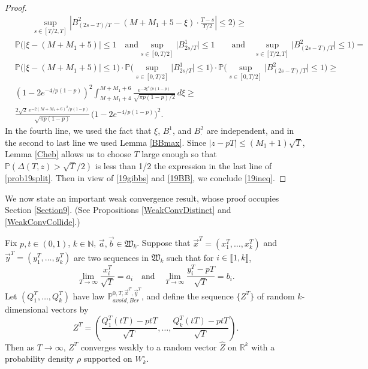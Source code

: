 \begin{proof}
\begin{equation}
\begin{split}
	&\qquad  \sup_{s\in[T/2,T]}\left|B^2_{(2s-T)/T}-(M+M_1+5-\xi)\cdot\frac{T-s}{T/2}\right| \leq 2 \bigg) \geq \\
	& \mathbb{P}\bigg(|\xi - (M+M_1+5)|\leq 1 \quad\mathrm{and} \sup_{s\in[0,T/2]}\big|B^1_{2s/T}\big| \leq 1 \qquad \mathrm{and}\quad \sup_{s\in[T/2,T]}\big|B^2_{(2s-T)/T}\big| \leq 1 \bigg) =\\
	& \mathbb{P}\Big(|\xi-(M+M_1+5)|\leq 1\Big)\cdot \mathbb{P}\bigg(\sup_{s\in[0,T/2]} \big|B^1_{2s/T}\big|\leq 1\bigg)\cdot \mathbb{P}\bigg(\sup_{s\in[0,T/2]} \big|B^2_{(2s-T)/T}\big|\leq 1\bigg) \geq\\
	& \left(1-2e^{-4/p(1-p)}\right)^2 \int_{M+M_1+4}^{M+M_1+6} \frac{e^{-2\xi^2/p(1-p)}}{\sqrt{\pi p(1-p)/2}}\,d\xi \geq\\
	& \frac{2\sqrt{2}\,e^{-2(M+M_1+6)^2/p(1-p)}}{\sqrt{\pi p(1-p)}}\,\big(1-2e^{-4/p(1-p)}\big)^2.
	\end{split}
	\end{equation}
	In the fourth line, we used the fact that $\xi$, $B^1_\cdot$, and $B^2_\cdot$ are independent, and in the second to last line we used Lemma \ref{BBmax}. Since $|z-pT|\leq (M_1+1)\sqrt{T}$, Lemma \ref{Cheb} allows us to choose $T$ large enough so that $\mathbb{P}(\Delta(T,z) > \sqrt{T}/2)$ is less than 1/2 the expression in the last line of \eqref{prob19split}. Then in view of \eqref{19gibbs} and \eqref{19BB}, we conclude \eqref{19ineq}.
	
\end{proof}

We now state an important weak convergence result, whose proof occupies Section \ref{Section9}. (See Propositions \ref{WeakConvDistinct} and \ref{WeakConvCollide}.)

\begin{proposition}\label{prob17}
Fix $p,t\in(0,1)$, $k\in\mathbb{N}$, $\vec a, \vec b\in \mathfrak{W}_k$.  Suppose that $\vec{x}^{T}=(x_{1}^{T},\dots,x_{k}^{T})$ and $\vec{y}^{T}=(y_{1}^{T},\dots,y_{k}^{T})$ are two sequences in $\mathfrak{W}_k$ such that for $i\in \llbracket 1,k\rrbracket$, $$\lim_{T\rightarrow\infty}\frac{x_{i}^{T}}{\sqrt{T}}=a_{i} \quad \text{and} \quad \lim_{T\rightarrow\infty}\frac{y_{i}^{T}-pT}{\sqrt{T}}=b_{i}.$$  Let $(Q_1^T,\dots,Q_k^T)$ have law $\mathbb{P}^{0,T,\vec{x}^{T},\vec{y}^{T}}_{avoid,Ber}$, and define the sequence $\{Z^T\}$ of random $k$-dimensional vectors by $$Z^{T}=\left(\frac{Q_{1}^T(tT)-ptT}{\sqrt{T}},\dots,\frac{Q_{k}^T(tT)-ptT}{\sqrt{T}}\right).$$ Then as $T\to\infty$, $Z^{T}$ converges weakly to a random vector $\hat Z$ on $\mathbb{R}^k$ with a probability density $\rho$ supported on $W_k^\circ$.
\end{proposition}

